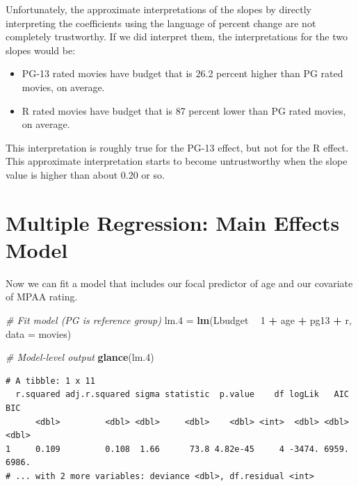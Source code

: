 \documentclass[]{book}
\newenvironment{Shaded}{\begin{snugshade}}{\end{snugshade}}
\newcommand{\CommentTok}[1]{\textcolor[rgb]{0.56,0.35,0.01}{\textit{#1}}}
\newcommand{\DataTypeTok}[1]{\textcolor[rgb]{0.13,0.29,0.53}{#1}}
\newcommand{\DecValTok}[1]{\textcolor[rgb]{0.00,0.00,0.81}{#1}}
\newcommand{\FloatTok}[1]{\textcolor[rgb]{0.00,0.00,0.81}{#1}}
\newcommand{\KeywordTok}[1]{\textcolor[rgb]{0.13,0.29,0.53}{\textbf{#1}}}
\newcommand{\NormalTok}[1]{#1}
\newcommand{\OperatorTok}[1]{\textcolor[rgb]{0.81,0.36,0.00}{\textbf{#1}}}
\newcommand{\StringTok}[1]{\textcolor[rgb]{0.31,0.60,0.02}{#1}}
\providecommand{\tightlist}{%
  \setlength{\itemsep}{0pt}\setlength{\parskip}{0pt}}
\begin{document}
Unfortunately, the approximate interpretations of the slopes by directly interpreting the coefficients using the language of percent change are not completely trustworthy. If we did interpret them, the interpretations for the two slopes would be:

\begin{itemize}
\tightlist
\item
  PG-13 rated movies have budget that is 26.2 percent higher than PG rated movies, on average.
\item
  R rated movies have budget that is 87 percent lower than PG rated movies, on average.
\end{itemize}

This interpretation is roughly true for the PG-13 effect, but not for the R effect. This approximate interpretation starts to become untrustworthy when the slope value is higher than about 0.20 or so.

\hypertarget{multiple-regression-main-effects-model}{%
\section{Multiple Regression: Main Effects Model}\label{multiple-regression-main-effects-model}}

Now we can fit a model that includes our focal predictor of age and our covariate of MPAA rating.

\begin{Shaded}
\begin{Highlighting}[]
\CommentTok{# Fit model (PG is reference group)}
\NormalTok{lm}\FloatTok{.4}\NormalTok{ =}\StringTok{ }\KeywordTok{lm}\NormalTok{(Lbudget }\OperatorTok{~}\StringTok{ }\DecValTok{1} \OperatorTok{+}\StringTok{ }\NormalTok{age }\OperatorTok{+}\StringTok{ }\NormalTok{pg13 }\OperatorTok{+}\StringTok{ }\NormalTok{r, }\DataTypeTok{data =}\NormalTok{ movies)}

\CommentTok{# Model-level output}
\KeywordTok{glance}\NormalTok{(lm}\FloatTok{.4}\NormalTok{)}
\end{Highlighting}
\end{Shaded}

\begin{verbatim}
# A tibble: 1 x 11
  r.squared adj.r.squared sigma statistic  p.value    df logLik   AIC   BIC
      <dbl>         <dbl> <dbl>     <dbl>    <dbl> <int>  <dbl> <dbl> <dbl>
1     0.109         0.108  1.66      73.8 4.82e-45     4 -3474. 6959. 6986.
# ... with 2 more variables: deviance <dbl>, df.residual <int>
\end{verbatim}
\end{document}
